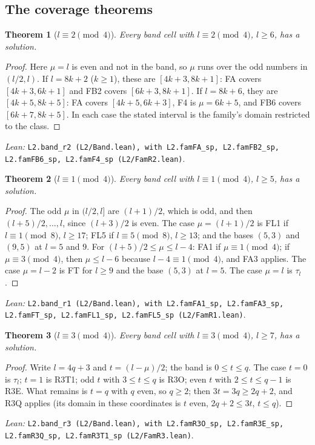 \documentclass[11pt]{amsart}
\theoremstyle{plain}
\newtheorem{theorem}{Theorem}[section]
\theoremstyle{definition}
\theoremstyle{remark}
\newcommand{\lean}[1]{\par\smallskip
  {\small\raggedright\noindent\textit{Lean:} \texttt{#1}.\par}\smallskip}
\begin{document}
\subsection*{The coverage theorems}

\begin{theorem}[$l \equiv 2 \pmod 4$]\label{thm:cov2}
Every band cell with $l \equiv 2 \pmod 4$, $l \ge 6$, has a solution.
\end{theorem}

\begin{proof}
Here $\mu = l$ is even and not in the band, so $\mu$ runs over the odd numbers in
$(l/2,l)$. If $l = 8k+2$ ($k \ge 1$), these are $[4k+3,8k+1]$: FA covers
$[4k+3,6k+1]$ and FB2 covers $[6k+3,8k+1]$. If $l = 8k+6$, they are $[4k+5,8k+5]$: FA
covers $[4k+5,6k+3]$, F4 is $\mu = 6k+5$, and FB6 covers $[6k+7,8k+5]$. In each case the
stated interval is the family's domain restricted to the class.
\end{proof}
\lean{L2.band\_r2 (L2/Band.lean), with L2.famFA\_sp, L2.famFB2\_sp, L2.famFB6\_sp,
L2.famF4\_sp (L2/FamR2.lean)}

\begin{theorem}[$l \equiv 1 \pmod 4$]\label{thm:cov1}
Every band cell with $l \equiv 1 \pmod 4$, $l \ge 5$, has a solution.
\end{theorem}

\begin{proof}
The odd $\mu$ in $(l/2,l]$ are $(l+1)/2$, which is odd, and then $(l+5)/2, \dots, l$,
since $(l+3)/2$ is even. The case $\mu = (l+1)/2$ is FL1 if $l \equiv 1 \pmod 8$,
$l \ge 17$; FL5 if $l \equiv 5 \pmod 8$, $l \ge 13$; and the bases $(5,3)$ and $(9,5)$
at $l = 5$ and $9$. For $(l+5)/2 \le \mu \le l-4$: FA1 if $\mu \equiv 1 \pmod 4$; if
$\mu \equiv 3 \pmod 4$, then $\mu \le l-6$ because $l - 4 \equiv 1 \pmod 4$, and FA3
applies. The case $\mu = l-2$ is FT for $l \ge 9$ and the base $(5,3)$ at $l = 5$. The
case $\mu = l$ is $\tau_l$.
\end{proof}
\lean{L2.band\_r1 (L2/Band.lean), with L2.famFA1\_sp, L2.famFA3\_sp, L2.famFT\_sp, L2.famFL1\_sp,
L2.famFL5\_sp (L2/FamR1.lean)}

\begin{theorem}[$l \equiv 3 \pmod 4$]\label{thm:cov3}
Every band cell with $l \equiv 3 \pmod 4$, $l \ge 7$, has a solution.
\end{theorem}

\begin{proof}
Write $l = 4q+3$ and $t = (l-\mu)/2$; the band is $0 \le t \le q$. The case $t = 0$ is
$\tau_l$; $t = 1$ is R3T1; odd $t$ with $3 \le t \le q$ is R3O; even $t$ with
$2 \le t \le q-1$ is R3E. What remains is $t = q$ with $q$ even, so $q \ge 2$; then
$3t = 3q \ge 2q+2$, and R3Q applies (its domain in these coordinates is $t$ even,
$2q+2 \le 3t$, $t \le q$).
\end{proof}
\lean{L2.band\_r3 (L2/Band.lean), with L2.famR3O\_sp, L2.famR3E\_sp, L2.famR3Q\_sp, L2.famR3T1\_sp
(L2/FamR3.lean)}
\end{document}
